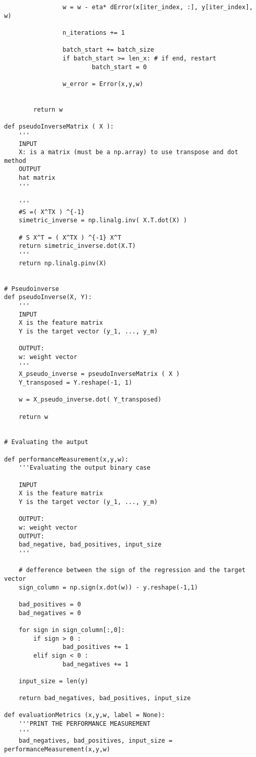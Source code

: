 \begin{verbatim}
                w = w - eta* dError(x[iter_index, :], y[iter_index], w)
                
                n_iterations += 1

                batch_start += batch_size
                if batch_start >= len_x: # if end, restart
                        batch_start = 0
                
                w_error = Error(x,y,w)


        return w

def pseudoInverseMatrix ( X ):
    '''
    INPUT 
    X: is a matrix (must be a np.array) to use transpose and dot method
    OUTPUT
    hat matrix 
    '''

    '''
    #S =( X^TX ) ^{-1}
    simetric_inverse = np.linalg.inv( X.T.dot(X) )

    # S X^T = ( X^TX ) ^{-1} X^T
    return simetric_inverse.dot(X.T)
    '''
    return np.linalg.pinv(X)


# Pseudoinverse	
def pseudoInverse(X, Y):
    ''' 
    INPUT
    X is the feature matrix 
    Y is the target vector (y_1, ..., y_m)
    
    OUTPUT: 
    w: weight vector
    '''
    X_pseudo_inverse = pseudoInverseMatrix ( X )
    Y_transposed = Y.reshape(-1, 1)
    
    w = X_pseudo_inverse.dot( Y_transposed)
    
    return w


# Evaluating the autput

def performanceMeasurement(x,y,w):
    '''Evaluating the output binary case

    INPUT
    X is the feature matrix 
    Y is the target vector (y_1, ..., y_m)
    
    OUTPUT: 
    w: weight vector
    OUTPUT: 
    bad_negative, bad_positives, input_size
    '''

    # defference between the sign of the regression and the target vector
    sign_column = np.sign(x.dot(w)) - y.reshape(-1,1)

    bad_positives = 0
    bad_negatives = 0
    
    for sign in sign_column[:,0]:
        if sign > 0 :
                bad_positives += 1
        elif sign < 0 :
                bad_negatives += 1

    input_size = len(y)

    return bad_negatives, bad_positives, input_size

def evaluationMetrics (x,y,w, label = None):
    '''PRINT THE PERFORMANCE MEASUREMENT
    '''
    bad_negatives, bad_positives, input_size = performanceMeasurement(x,y,w)


\end{verbatim}
